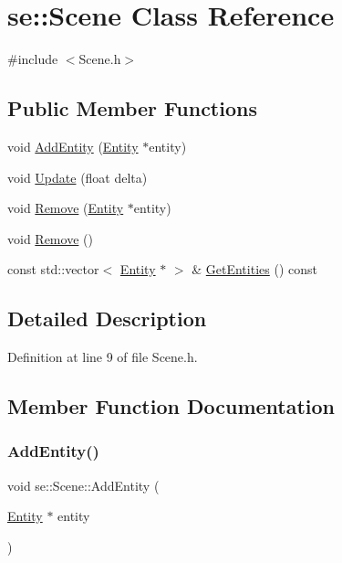 \hypertarget{classse_1_1_scene}{}\section{se\+:\+:Scene Class Reference}
\label{classse_1_1_scene}


{\ttfamily \#include $<$Scene.\+h$>$}

\subsection*{Public Member Functions}
\begin{DoxyCompactItemize}
\item 
void \mbox{\hyperlink{classse_1_1_scene_a21dde7d731d672d4c424397850864549}{Add\+Entity}} (\mbox{\hyperlink{classse_1_1_entity}{Entity}} $\ast$entity)
\item 
void \mbox{\hyperlink{classse_1_1_scene_acdc3858f5d4fd76cf9a712a02218341a}{Update}} (float delta)
\item 
void \mbox{\hyperlink{classse_1_1_scene_a4133b3e65c59229d8926dde7976ec004}{Remove}} (\mbox{\hyperlink{classse_1_1_entity}{Entity}} $\ast$entity)
\item 
void \mbox{\hyperlink{classse_1_1_scene_a73f7789f2585e65174380be509b88435}{Remove}} ()
\item 
const std\+::vector$<$ \mbox{\hyperlink{classse_1_1_entity}{Entity}} $\ast$ $>$ \& \mbox{\hyperlink{classse_1_1_scene_a1c3f1fc4ab110f9caab190cce13c2e03}{Get\+Entities}} () const
\end{DoxyCompactItemize}


\subsection{Detailed Description}


Definition at line 9 of file Scene.\+h.



\subsection{Member Function Documentation}
\mbox{\label{classse_1_1_scene_a21dde7d731d672d4c424397850864549}} 
\subsubsection{\texorpdfstring{Add\+Entity()}{AddEntity()}}
{\footnotesize\ttfamily void se\+::\+Scene\+::\+Add\+Entity (\begin{DoxyParamCaption}\item[{\mbox{\hyperlink{classse_1_1_entity}{Entity}} $\ast$}]{entity }\end{DoxyParamCaption})}

